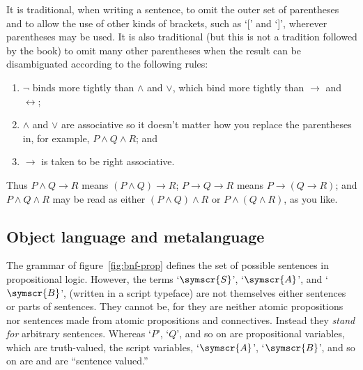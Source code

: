 \documentclass{article}
\newcommand{\wff}[1]{\ensuremath{\symscr{#1}}} %
\begin{document}
It is traditional, when writing a sentence, to omit the outer set of
parentheses and to allow the use of other kinds of brackets, such as `['
and `]', wherever parentheses may be used. It is also traditional (but
this is not a tradition followed by the book) to omit many other
parentheses when the result can be disambiguated according to the
following rules: 
\begin{enumerate}
\item $\neg$ binds more tightly than $\wedge$ and $\vee$, which bind more tightly
  than $\to$ and $\leftrightarrow$;
\item $\wedge$ and $\vee$ are associative so it doesn't matter how you replace the parentheses in, for example, $P\wedge Q\wedge R$; and
\item $\to$ is taken to be right associative.
\end{enumerate}
Thus $P\wedge Q\to R$ means $(P\wedge Q)\to R$; $P\to Q\to R$ means $P \to (Q \to R)$; and $P\wedge Q \wedge R$ may be read as either $(P\wedge Q)\wedge R$ or $P\wedge (Q\wedge R)$, as you like.

\subsection{Object language and metalanguage}

The grammar of figure~\ref{fig:bnf-prop} defines the set of possible
sentences in propositional logic. However, the terms `\wff{S}',
`\wff{A}', and `\wff{B}', (written in a script typeface) are not
themselves either sentences or parts of sentences.  They cannot be, for
they are neither atomic propositions nor sentences made from atomic
propositions and connectives.  Instead they \emph{stand for} arbitrary sentences.  Whereas `$P$', `$Q$', and so on are propositional variables, which are truth-valued, the script variables, `\wff{A}', `\wff{B}', and so on are  and are ``sentence valued.'' 
\end{document}
